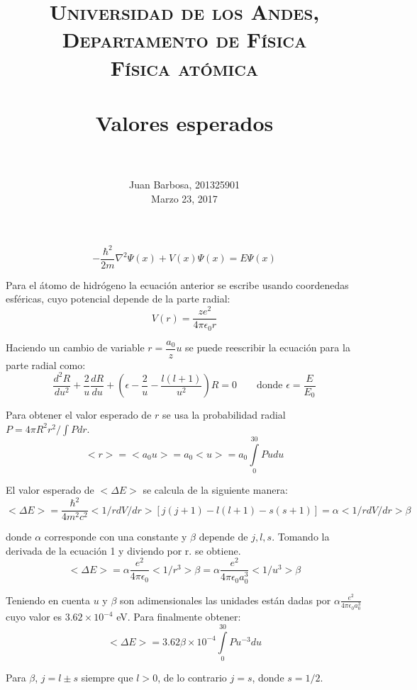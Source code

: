 \documentclass[paper=letter, fontsize=11pt]{scrartcl}
\title{
        \usefont{OT1}{bch}{b}{n}
        \normalfont \normalsize \textsc{Universidad de los Andes, Departamento de F\'isica \\
        F\'isica at\'omica} \\ [25pt]
        \horrule{0.5pt} \\[0.4cm]
        \huge Valores esperados \\
        \horrule{2pt} \\[0.5cm]
}
\author{
        \normalfont                                 \normalsize
        Juan Barbosa, 201325901\\[-3pt]      \normalsize
        Marzo 23, 2017
}
\date{}
\begin{document}
\maketitle

\[
\boxed{-\dfrac{\hbar^2}{2m}\nabla^2\Psi(x) + V(x)\Psi(x) = E\Psi(x)}
\]

Para el \'atomo de hidr\'ogeno la ecuaci\'on anterior se escribe usando coordenedas esf\'ericas, cuyo potencial depende de la parte radial:
\begin{equation}
	V(r) = \dfrac{ze^2}{4\pi\epsilon_0r}
\end{equation}

Haciendo un cambio de variable $r=\dfrac{a_0}{z}u$ se puede reescribir la ecuaci\'on para la parte radial como:
\begin{equation}
	\dfrac{d^2R}{du^2} + \dfrac{2}{u}\dfrac{dR}{du} + \left(\epsilon - \dfrac{2}{u} - \dfrac{l(l+1)}{u^2}\right)R = 0
	\qquad \text{donde } \epsilon=\dfrac{E}{E_0}
\end{equation}

Para obtener el valor esperado de $r$ se usa la probabilidad radial $P=4\pi R^2r^2/\int Pdr$.
\begin{equation}
	<r> = <a_0u> = a_0<u> = a_0\int\limits_{0}^{30}Pudu
\end{equation}

El valor esperado de $<\Delta E>$ se calcula de la siguiente manera:
\begin{equation}
	<\Delta E> = \dfrac{\hbar^2}{4m^2c^2}<1/rdV/dr>\left[j(j+1)-l(l+1)-s(s+1)\right] = \alpha <1/rdV/dr> \beta
\end{equation}

donde $\alpha$ corresponde con una constante y $\beta$ depende de $j, l, s$. Tomando la derivada de la ecuaci\'on 1 y diviendo por r. se obtiene.
\begin{equation}
	<\Delta E> = \alpha \dfrac{e^2}{4\pi\epsilon_0}<1/r^3>\beta = \alpha \dfrac{e^2}{4\pi\epsilon_0a_0^3}<1/u^3>\beta
\end{equation}

Teniendo en cuenta $u$ y $\beta$ son adimensionales las unidades est\'an dadas por $\alpha\frac{e^2}{4\pi\epsilon_0a_0^3}$ cuyo valor es $3.62\times 10^{-4}$ eV. Para finalmente obtener:
\begin{equation}
	<\Delta E> = 3.62\beta\times 10^{-4}\int\limits_{0}^{30}Pu^{-3}du
\end{equation}

Para $\beta$, $j = l\pm s$ siempre que $l>0$, de lo contrario $j = s$, donde $s=1/2$.

\end{document}
